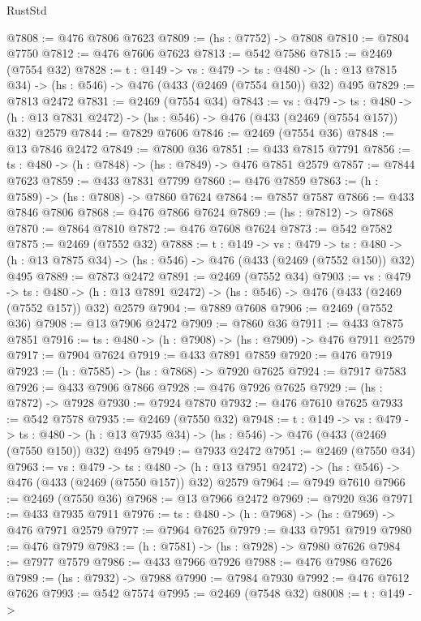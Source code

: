 \begin{lexlean}{RustStd}
\begin{coremodule}
@7808 := @476 @7806 @7623
@7809 := (hs : @7752) -> @7808
@7810 := @7804 @7750
@7812 := @476 @7606 @7623
@7813 := @542 @7586
@7815 := @2469 (@7554 @32)
@7828 := {t : @149} ->
  {vs : @479} ->
  {ts : @480} -> (h : @13 @7815 @34) -> (hs : @546) -> @476 (@433 (@2469 (@7554 @150)) @32) @495
@7829 := @7813 @2472
@7831 := @2469 (@7554 @34)
@7843 := {vs : @479} ->
  {ts : @480} -> (h : @13 @7831 @2472) -> (hs : @546) -> @476 (@433 (@2469 (@7554 @157)) @32) @2579
@7844 := @7829 @7606
@7846 := @2469 (@7554 @36)
@7848 := @13 @7846 @2472
@7849 := @7800 @36
@7851 := @433 @7815 @7791
@7856 := {ts : @480} -> (h : @7848) -> (hs : @7849) -> @476 @7851 @2579
@7857 := @7844 @7623
@7859 := @433 @7831 @7799
@7860 := @476 @7859
@7863 := (h : @7589) -> (hs : @7808) -> @7860 @7624
@7864 := @7857 @7587
@7866 := @433 @7846 @7806
@7868 := @476 @7866 @7624
@7869 := (hs : @7812) -> @7868
@7870 := @7864 @7810
@7872 := @476 @7608 @7624
@7873 := @542 @7582
@7875 := @2469 (@7552 @32)
@7888 := {t : @149} ->
  {vs : @479} ->
  {ts : @480} -> (h : @13 @7875 @34) -> (hs : @546) -> @476 (@433 (@2469 (@7552 @150)) @32) @495
@7889 := @7873 @2472
@7891 := @2469 (@7552 @34)
@7903 := {vs : @479} ->
  {ts : @480} -> (h : @13 @7891 @2472) -> (hs : @546) -> @476 (@433 (@2469 (@7552 @157)) @32) @2579
@7904 := @7889 @7608
@7906 := @2469 (@7552 @36)
@7908 := @13 @7906 @2472
@7909 := @7860 @36
@7911 := @433 @7875 @7851
@7916 := {ts : @480} -> (h : @7908) -> (hs : @7909) -> @476 @7911 @2579
@7917 := @7904 @7624
@7919 := @433 @7891 @7859
@7920 := @476 @7919
@7923 := (h : @7585) -> (hs : @7868) -> @7920 @7625
@7924 := @7917 @7583
@7926 := @433 @7906 @7866
@7928 := @476 @7926 @7625
@7929 := (hs : @7872) -> @7928
@7930 := @7924 @7870
@7932 := @476 @7610 @7625
@7933 := @542 @7578
@7935 := @2469 (@7550 @32)
@7948 := {t : @149} ->
  {vs : @479} ->
  {ts : @480} -> (h : @13 @7935 @34) -> (hs : @546) -> @476 (@433 (@2469 (@7550 @150)) @32) @495
@7949 := @7933 @2472
@7951 := @2469 (@7550 @34)
@7963 := {vs : @479} ->
  {ts : @480} -> (h : @13 @7951 @2472) -> (hs : @546) -> @476 (@433 (@2469 (@7550 @157)) @32) @2579
@7964 := @7949 @7610
@7966 := @2469 (@7550 @36)
@7968 := @13 @7966 @2472
@7969 := @7920 @36
@7971 := @433 @7935 @7911
@7976 := {ts : @480} -> (h : @7968) -> (hs : @7969) -> @476 @7971 @2579
@7977 := @7964 @7625
@7979 := @433 @7951 @7919
@7980 := @476 @7979
@7983 := (h : @7581) -> (hs : @7928) -> @7980 @7626
@7984 := @7977 @7579
@7986 := @433 @7966 @7926
@7988 := @476 @7986 @7626
@7989 := (hs : @7932) -> @7988
@7990 := @7984 @7930
@7992 := @476 @7612 @7626
@7993 := @542 @7574
@7995 := @2469 (@7548 @32)
@8008 := {t : @149} ->

\end{coremodule}
\end{lexlean}

